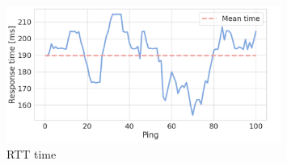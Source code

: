 \begin{figure}[H]
    \centering
    \includegraphics[width=0.8\textwidth]{pictures/ping.png}
    \caption{ RTT time }
    \label{fig:ping}
\end{figure}